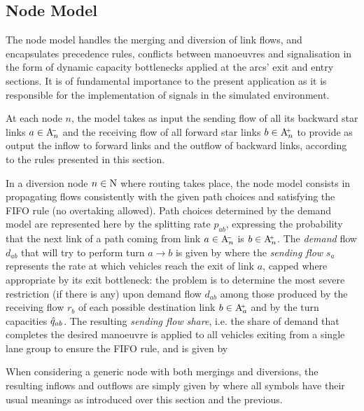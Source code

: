 \subsection{Node Model} \label{s:nodemodel}
The node model handles the merging and diversion of link flows, and encapsulates precedence rules, conflicts between manoeuvres and signalisation in the form of dynamic capacity bottlenecks applied at the arcs' exit and entry sections. It is of fundamental importance to the present application as it is responsible for the implementation of signals in the simulated environment.

At each node $n$, the model takes as input the sending flow of all its backward star links $a \in \mathrm{A}_{n}^{\scriptscriptstyle{\hspace{-2pt}-}}$ and the receiving flow of all forward star links $b \in \mathrm{A}_{n}^{\scriptscriptstyle{\hspace{-2pt}+}}$ to provide as output the inflow to forward links and the outflow of backward links, according to the rules presented in this section.

In a diversion node $n \in \mathrm{N}$ where routing takes place, the node model consists in propagating flows consistently with the given path choices and satisfying the FIFO rule (no overtaking allowed). Path choices determined by the demand model are represented here by the splitting rate $p_{ab}$, expressing the probability that the next link of a path coming from link $a \in \mathrm{A}_{n}^{\scriptscriptstyle{\hspace{-2pt}-}}$ is $b \in \mathrm{A}_{n}^{\scriptscriptstyle{\hspace{-2pt}+}}$. The \emph{demand} flow $d_{ab}$ that will try to perform turn $a \rightarrow b$ is given by
where the \emph{sending flow} $s_a$ represents the rate at which vehicles reach the exit of link $a$, capped where appropriate by its exit bottleneck: the problem is to determine the most severe restriction (if there is any) upon demand flow $d_{ab}$ among those produced by the receiving flow $r_b$ of each possible destination link $b \in \mathrm{A}_{a}^{\scriptscriptstyle{\hspace{-2pt}+}}$ and by the turn capacities $\hat{q}_{ab}$. The resulting \emph{sending flow share}, i.e. the share of demand that completes the desired manoeuvre is applied to all vehicles exiting from a single lane group to ensure the FIFO rule, and is given by

When considering a generic node with both mergings and diversions, the resulting inflows and outflows are simply given by
where all symbols have their usual meanings as introduced over this section and the previous.

